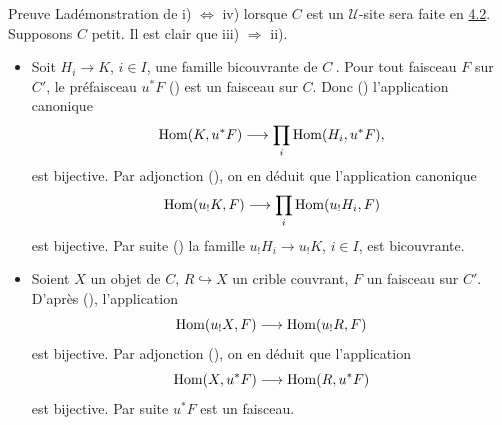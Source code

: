 \documentclass[10pt]{../fichiers-configuration-latex/smfart}
\begin{document}
\begin{enonce*}[remark]{Preuve}
La\pageoriginale démonstration de i) $\Leftrightarrow$ iv)
lorsque $C$ est un $𝒰$-site sera faite en
\hyperref[III.subsec4.2]{4.2}. Supposons $C$ petit. Il est clair que iii)
$\Rightarrow$ ii).
\begin{itemize}
\item[i) $\Rightarrow$ iii):] Soit $H_i\rightarrow K$, $i\in I$, une
  famille bicouvrante de $C^{\widehat{\phantom{,}}}$. Pour tout
  faisceau $F$ sur $C'$, le préfaisceau $u^\ast F$ () est un
  faisceau sur $C$. Donc () l'application canonique
$$
\operatorname{Hom}(K, u^\ast F)\longrightarrow \prod_i \operatorname{Hom}(H_i, u^\ast F){},
$$
est bijective. Par adjonction (), on en déduit que
l'application canonique
$$
\operatorname{Hom}(u_{!}K,F)\longrightarrow \prod_i \operatorname{Hom}(u_{!}H_i, F)
$$
est bijective. Par suite () la famille
$u_{!}H_i\rightarrow u_{!}K$, $i\in I$, est bicouvrante.

\item[ii) $\Rightarrow$ i):] Soient $X$ un objet de $C$,
  $R\hookrightarrow X$ un crible couvrant, $F$ un faisceau sur
  $C'$. D'après (), l'application
$$
\operatorname{Hom}(u_{!}X,F)\longrightarrow \operatorname{Hom}(u_{!}R,F)
$$
est bijective. Par adjonction (), on en déduit que
l'application
$$
\operatorname{Hom}(X,u^\ast F)\longrightarrow \operatorname{Hom}(R, u^\ast F)
$$
est bijective. Par suite $u^\ast F$ est un faisceau.


\end{itemize}
\end{enonce*}
\end{document}
